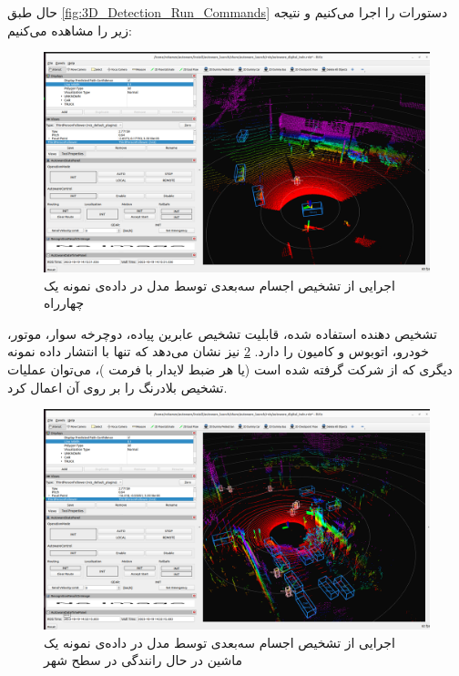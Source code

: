حال طبق \cref{fig:3D_Detection_Run_Commands} دستورات را اجرا می‌کنیم و نتیجه زیر را مشاهده می‌کنیم:
\begin{figure}[h!]
    \centering
    \includegraphics[width=0.85\linewidth]{figures/3D_Object_Detection.png}
    \caption{اجرایی از تشخیص اجسام سه‌بعدی توسط مدل   در داده‌ی نمونه یک چهارراه}
    \label{fig:3D_Object_Detection}
\end{figure}

تشخیص دهنده ‌استفاده شده، قابلیت تشخیص عابرین پیاده، دوچرخه سوار، موتور، خودرو، اتوبوس و کامیون را دارد.
\cref{fig:3D_Detection_Driving} نیز نشان می‌دهد که تنها با انتشار داده‌ نمونه دیگری که از شرکت  گرفته شده است (یا هر ضبط لایدار با فرمت )، می‌توان عملیات تشخیص بلادرنگ را بر روی آن اعمال کرد.

\begin{figure}[h!]
    \centering
    \includegraphics[width=0.9\linewidth]{figures/3D_Detection_Driving.png}
    \caption{اجرایی از تشخیص اجسام سه‌بعدی توسط مدل  در داده‌ی نمونه یک ماشین در حال رانندگی در سطح شهر}
    \label{fig:3D_Detection_Driving}
\end{figure}


